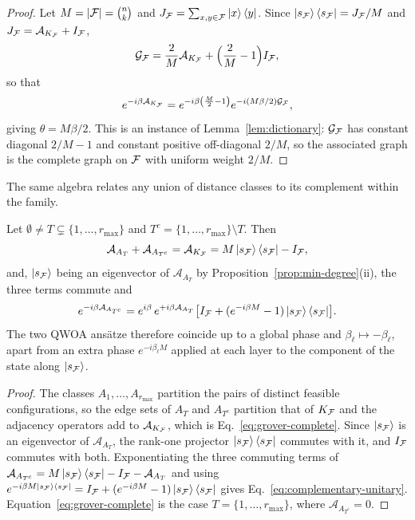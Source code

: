 {\begin{proof}
Let $M=|\mathcal{F}|=\binom{n}{k}$ and $J_{\mathcal{F}}=\sum_{x,y\in\mathcal{F}}\ket{x}\bra{y}$. Since $\ket{s_{\mathcal{F}}}\bra{s_{\mathcal{F}}}=J_{\mathcal{F}}/M$ and $J_{\mathcal{F}}=\mathcal{A}_{K_{\mathcal{F}}}+I_{\mathcal{F}}$,
\begin{equation}
    \mathcal{G}_{\mathcal{F}}
    =
    \frac{2}{M}\mathcal{A}_{K_{\mathcal{F}}}
    +\Bigl(\frac{2}{M}-1\Bigr)I_{\mathcal{F}},
\end{equation}
so that
\begin{equation}
    e^{-i\beta \mathcal{A}_{K_{\mathcal{F}}}}
    =
    e^{-i\beta\left(\frac{M}{2}-1\right)}
    e^{-i(M\beta/2)\mathcal{G}_{\mathcal{F}}},
    \label{eq:grover-rescaling}
\end{equation}
giving $\theta=M\beta/2$. This is an instance of Lemma~\ref{lem:dictionary}: $\mathcal{G}_{\mathcal{F}}$ has constant diagonal $2/M-1$ and constant positive off-diagonal $2/M$, so the associated graph is the complete graph on $\mathcal{F}$ with uniform weight $2/M$.
\end{proof}

The same algebra relates any union of distance classes to its complement within the family.

\begin{proposition}
\label{prop:complementary}
Let $\emptyset\neq T\subsetneq\{1,\dots,r_{\max}\}$ and $T^{c}=\{1,\dots,r_{\max}\}\setminus T$. Then
\begin{equation}
    \mathcal{A}_{A_T}+\mathcal{A}_{A_{T^{c}}}
    =
    \mathcal{A}_{K_{\mathcal{F}}}
    =
    M\ket{s_{\mathcal{F}}}\bra{s_{\mathcal{F}}}-I_{\mathcal{F}} ,
    \label{eq:complementary-sum}
\end{equation}
and, $\ket{s_{\mathcal{F}}}$ being an eigenvector of $\mathcal{A}_{A_T}$ by Proposition~\ref{prop:min-degree}(ii), the three terms commute and
\begin{equation}
    e^{-i\beta\mathcal{A}_{A_{T^{c}}}}
    =
    e^{i\beta}\,e^{+i\beta\mathcal{A}_{A_T}}
    \bigl[I_{\mathcal{F}}+(e^{-i\beta M}-1)\ket{s_{\mathcal{F}}}\bra{s_{\mathcal{F}}}\bigr] .
    \label{eq:complementary-unitary}
\end{equation}
The two QWOA ans\"atze therefore coincide up to a global phase and $\beta_\ell\mapsto-\beta_\ell$, apart from an extra phase $e^{-i\beta_\ell M}$ applied at each layer to the component of the state along $\ket{s_{\mathcal{F}}}$.
\end{proposition}

\begin{proof}
The classes $A_1,\dots,A_{r_{\max}}$ partition the pairs of distinct feasible configurations, so the edge sets of $A_T$ and $A_{T^{c}}$ partition that of $K_{\mathcal{F}}$ and the adjacency operators add to $\mathcal{A}_{K_{\mathcal{F}}}$, which is Eq.~\eqref{eq:grover-complete}. Since $\ket{s_{\mathcal{F}}}$ is an eigenvector of $\mathcal{A}_{A_T}$, the rank-one projector $\ket{s_{\mathcal{F}}}\bra{s_{\mathcal{F}}}$ commutes with it, and $I_{\mathcal{F}}$ commutes with both. Exponentiating the three commuting terms of $\mathcal{A}_{A_{T^{c}}}=M\ket{s_{\mathcal{F}}}\bra{s_{\mathcal{F}}}-I_{\mathcal{F}}-\mathcal{A}_{A_T}$ and using $e^{-i\beta M\ket{s_{\mathcal{F}}}\bra{s_{\mathcal{F}}}} =I_{\mathcal{F}}+(e^{-i\beta M}-1)\ket{s_{\mathcal{F}}}\bra{s_{\mathcal{F}}}$ gives Eq.~\eqref{eq:complementary-unitary}. Equation~\eqref{eq:grover-complete} is the case $T=\{1,\dots,r_{\max}\}$, where $\mathcal{A}_{A_{T^{c}}}=0$.
\end{proof}

}
